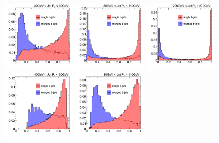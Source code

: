 \begin{figure}[tp]
\centering
\includegraphics[width=0.32\textwidth]{FIGS/TEMPFigs/MVA_differentMethods/bins/NNoutput040_LihoodKDE.pdf}
\includegraphics[width=0.32\textwidth]{FIGS/TEMPFigs/MVA_differentMethods/bins/NNoutput080_LihoodKDE.pdf}
\includegraphics[width=0.32\textwidth]{FIGS/TEMPFigs/MVA_differentMethods/bins/NNoutput200_LihoodKDE.pdf}
\includegraphics[width=0.32\textwidth]{FIGS/TEMPFigs/MVA_differentMethods/bins/NNoutput040_MLP.pdf}
\includegraphics[width=0.32\textwidth]{FIGS/TEMPFigs/MVA_differentMethods/bins/NNoutput080_MLP.pdf}

\end{figure}
